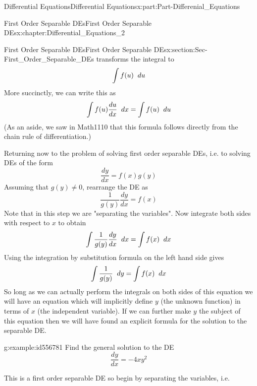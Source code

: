 \documentclass[oneside,10pt,]{book}
\numberwithin{equation}{section}
\begin{document}
\begin{partptx}{Differential Equations}{}{Differential Equations}{}{}{x:part:Part-Differenial_Equations}
\begin{chapterptx}{First Order Separable DEs}{}{First Order Separable DEs}{}{}{x:chapter:Differential_Equations_2}
\begin{sectionptx}{First Order Separable DEs}{}{First Order Separable DEs}{}{}{x:section:Sec-First_Order_Separable_DEs}
transforms the integral to%
\begin{equation*}
\int f(u)\hspace{2mm} du
\end{equation*}
More succinctly, we can write this as %
\begin{equation*}
\int f(u)\frac{du}{dx}\hspace{2mm} dx=\int f(u)\hspace{2mm} du
\end{equation*}
(As an aside, we saw in Math1110 that this formula follows directly from the chain rule of differentiation.)%
\par
Returning now to the problem of solving first order separable DEs, i.e. to solving DEs of the form%
\begin{equation*}
\frac{dy}{dx}=f(x)g(y)
\end{equation*}
Assuming that \(g(y)\neq 0\), rearrange the DE as%
\begin{equation*}
\frac{1}{g(y)}\frac{dy}{dx}=f(x)
\end{equation*}
Note that in this step we are "separating the variables". Now integrate both sides with respect to \(x\) to obtain%
\begin{equation*}
\int \frac{1}{g(y)}\frac{dy}{dx}\hspace{2mm} dx=\int f(x) \hspace{2mm} dx
\end{equation*}
Using the integration by substitution formula on the left hand side gives%
\begin{equation*}
\int \frac{1}{g(y)}\hspace{2mm} dy=\int f(x) \hspace{2mm} dx
\end{equation*}
So long as we can actually perform the integrals on both sides of this equation we will have an equation which will implicitly define \(y\) (the unknown function) in terms of \(x\) (the independent variable). If we can further make \(y\) the subject of this equation then we will have found an explicit formula for the solution to the separable DE.%
\begin{example}{}{g:example:id556781}%
Find the general solution to the DE%
\begin{equation*}
\frac{dy}{dx}=-4xy^2
\end{equation*}
%
\par\smallskip%
\noindent\hypertarget{g:solution:id556819}{}This is a first order separable DE so begin by separating the variables, i.e.%
\begin{equation*}

\end{equation*}
\end{example}
\end{sectionptx}
\end{chapterptx}
\end{partptx}
\end{document}
